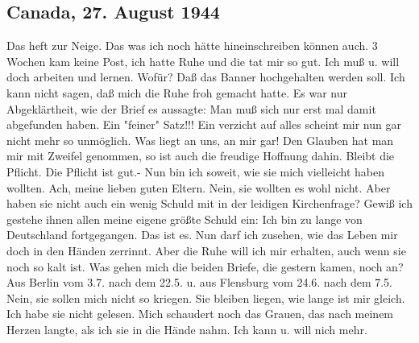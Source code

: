 \subsection{Canada, 27. August 1944}

Das heft zur Neige.
Das was ich noch h\"{a}tte hineinschreiben k\"{o}nnen auch.
3 Wochen kam keine Post, ich hatte Ruhe und die tat mir so gut.
Ich mu{\ss} u. will doch arbeiten und lernen.
Wof\"{u}r?
Da{\ss} das Banner hochgehalten werden soll.
Ich kann nicht sagen, da{\ss} mich die Ruhe froh gemacht hatte.
Es war nur Abgekl\"{a}rtheit, wie der Brief es aussagte: Man mu{\ss} sich nur erst mal damit abgefunden haben.
Ein "feiner" Satz!!!
Ein verzicht auf alles scheint mir nun gar nicht mehr so unm\"{o}glich.
Was liegt an uns, an mir gar!
Den Glauben hat man mir mit Zweifel genommen, so ist auch die freudige Hoffnung dahin.
Bleibt die Pflicht.
Die Pflicht ist gut.-
Nun bin ich soweit, wie sie mich vielleicht haben wollten.
Ach, meine lieben guten Eltern.
Nein, sie wollten es wohl nicht.
Aber haben sie nicht auch ein wenig Schuld mit in der leidigen Kirchenfrage?
Gewi{\ss} ich gestehe ihnen allen meine eigene gr\"{o}{\ss}te Schuld ein: Ich bin zu lange von Deutschland fortgegangen.
Das ist es.
Nun darf ich zusehen, wie das Leben mir doch in den H\"{a}nden zerrinnt.
Aber die Ruhe will ich mir erhalten, auch wenn sie noch so kalt ist.
Was gehen mich die beiden Briefe, die gestern kamen, noch an?
Aus Berlin vom 3.7. nach dem 22.5. u. aus Flensburg vom 24.6. nach dem 7.5.
Nein, sie sollen mich nicht so kriegen.
Sie bleiben liegen, wie lange ist mir gleich.
Ich habe sie nicht gelesen.
Mich schaudert noch das Grauen, das nach meinem Herzen langte, als ich sie in die H\"{a}nde nahm.
Ich kann u. will nich mehr.

\clearpage

